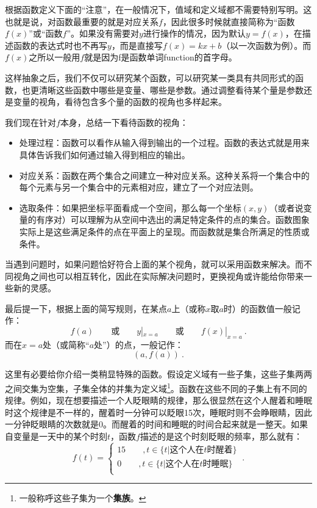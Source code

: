 根据函数定义下面的“注意”，在一般情况下，值域和定义域都不需要特别写明。这也就是说，对函数最重要的就是对应关系$f$，因此很多时候就直接简称为“函数$f(x)$”或“函数$f$”。如果没有需要对$y$进行操作的情况，因为默认$y=f(x)$，在描述函数的表达式时也不再写$y$，而是直接写$f(x)=kx+b$（以一次函数为例）。而$f(x)$之所以一般用$f$就是因为f是函数单词function的首字母。

这样抽象之后，我们不仅可以研究某个函数，可以研究某一类具有共同形式的函数，也更清晰这些函数中哪些是变量、哪些是参数。通过调整看待某个量是参数还是变量的视角，看待包含多个量的函数的视角也多样起来。

我们现在针对$f$本身，总结一下看待函数的视角：

\begin{itemize}
\item 处理过程：函数可以看作从输入得到输出的一个过程。函数的表达式就是用来具体告诉我们如何通过输入得到相应的输出。
\item 对应关系：函数在两个集合之间建立一种对应关系。这种关系将一个集合中的每个元素与另一个集合中的元素相对应，建立了一个对应法则。
\item 选取条件：如果把坐标平面看成一个空间，那么每一个坐标$(x,y)$（或者说变量的有序对）可以理解为从空间中选出的满足特定条件的点的集合。函数图象实际上是这些满足条件的点在平面上的呈现。而函数就是集合所满足的性质或条件。
\end{itemize}

当遇到问题时，如果问题恰好符合上面的某个视角，就可以采用函数来解决。而不同视角之间也可以相互转化，因此在实际解决问题时，更换视角或许能给你带来一些新的灵感。

最后提一下，根据上面的简写规则，在某点$a$上（或称$x$取$a$时）的函数值一般记作：
\begin{equation}
f(a)\qquad\text{或}\qquad y|_{x=a}\qquad\text{或}\qquad f(x)|_{x=a}~.
\end{equation}
而在$x=a$处（或简称“$a$处”）的点，一般记作：
\begin{equation}
(a,f(a))~.
\end{equation}

这里有必要给你介绍一类稍显特殊的函数。假设定义域有一些子集，这些子集两两之间交集为空集，子集全体的并集为定义域\footnote{一般称呼这些子集为一个\textbf{集族}。}。函数在这些不同的子集上有不同的规律。例如，现在想要描述一个人眨眼睛的规律，那么很显然在这个人醒着和睡眠时这个规律是不一样的，醒着时一分钟可以眨眼15次，睡眠时则不会睁眼睛，因此一分钟眨眼睛的次数就是0。而醒着的时间和睡眠的时间合起来就是一整天。如果自变量是一天中的某个时刻$t$，函数$f$描述的是这个时刻眨眼的频率，那么就有：
\begin{equation}
f(t)=
\begin{cases}
15\qquad,t\in\{t|\text{这个人在}t\text{时醒着}\}\\
0\qquad,t\in\{t|\text{这个人在}t\text{时睡眠}\}\\
\end{cases}~.
\end{equation}

